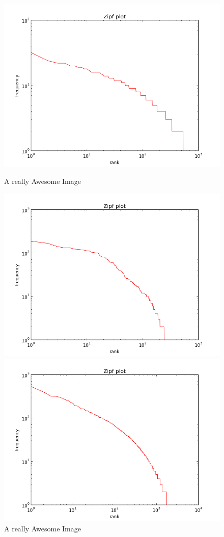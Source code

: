\documentclass[10pt]{book}
\begin{document}
\begin{figure}[!htb]
  \includegraphics[width=\linewidth]{hungdan_notes_2}
  \caption{A really Awesome Image}\label{fig:awesome_image1}
\endminipage\hfill
{}
  \includegraphics[width=\linewidth]{wish_notes_2}
  \caption{A really Awesome Image}\label{fig:awesome_image2}
\endminipage\hfill
{}%
  \includegraphics[width=\linewidth]{rach_notes_2}

\end{figure}
\end{document}
